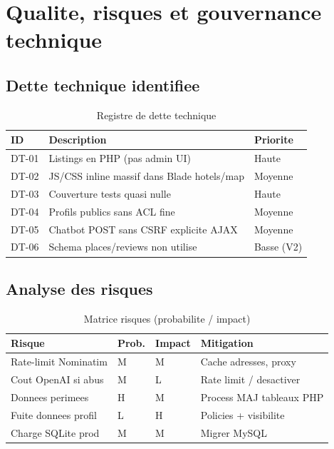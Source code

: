 \chapter{Qualite, risques et gouvernance technique}
\label{ch:quality}

\section{Dette technique identifiee}

\begin{table}[H]
\centering
\caption{Registre de dette technique}
\begin{tabularx}{\textwidth}{@{}lXl@{}}
\toprule
\textbf{ID} & \textbf{Description} & \textbf{Priorite} \\
\midrule
DT-01 & Listings en PHP (pas admin UI) & Haute \\
DT-02 & JS/CSS inline massif dans Blade hotels/map & Moyenne \\
DT-03 & Couverture tests quasi nulle & Haute \\
DT-04 & Profils publics sans ACL fine & Moyenne \\
DT-05 & Chatbot POST sans CSRF explicite AJAX & Moyenne \\
DT-06 & Schema places/reviews non utilise & Basse (V2) \\
\bottomrule
\end{tabularx}
\end{table}

\section{Analyse des risques}

\begin{table}[H]
\centering
\small
\caption{Matrice risques (probabilite / impact)}
\begin{tabular}{@{}llll@{}}
\toprule
\textbf{Risque} & \textbf{Prob.} & \textbf{Impact} & \textbf{Mitigation} \\
\midrule
Rate-limit Nominatim & M & M & Cache adresses, proxy \\
Cout OpenAI si abus & M & L & Rate limit / desactiver \\
Donnees perimees & H & M & Process MAJ tableaux PHP \\
Fuite donnees profil & L & H & Policies + visibilite \\
Charge SQLite prod & M & M & Migrer MySQL \\
\bottomrule
\end{tabular}
\end{table}

